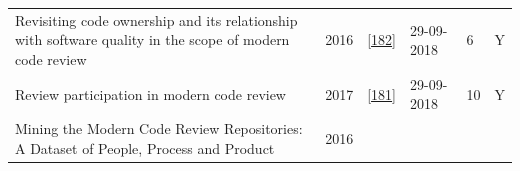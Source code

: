 \documentclass[]{book}
\begin{document}
\begin{longtable}[]{@{}llllll@{}}
\begin{minipage}[t]{0.47\columnwidth}
Revisiting code ownership and its relationship with software quality in
the scope of modern code review\strut
\end{minipage} & \begin{minipage}[t]{0.03\columnwidth}\raggedright\strut
2016\strut
\end{minipage} & \begin{minipage}[t]{0.13\columnwidth}\raggedright\strut
{[}\protect\hyperlink{ref-thongtanunam2016revisiting}{182}{]}\strut
\end{minipage} & \begin{minipage}[t]{0.06\columnwidth}\raggedright\strut
29-09-2018\strut
\end{minipage} & \begin{minipage}[t]{0.07\columnwidth}\raggedright\strut
6\strut
\end{minipage} & \begin{minipage}[t]{0.08\columnwidth}\raggedright\strut
Y\strut
\end{minipage}\tabularnewline
\begin{minipage}[t]{0.47\columnwidth}\raggedright\strut
Review participation in modern code review\strut
\end{minipage} & \begin{minipage}[t]{0.03\columnwidth}\raggedright\strut
2017\strut
\end{minipage} & \begin{minipage}[t]{0.13\columnwidth}\raggedright\strut
{[}\protect\hyperlink{ref-thongtanunam2017review}{181}{]}\strut
\end{minipage} & \begin{minipage}[t]{0.06\columnwidth}\raggedright\strut
29-09-2018\strut
\end{minipage} & \begin{minipage}[t]{0.07\columnwidth}\raggedright\strut
10\strut
\end{minipage} & \begin{minipage}[t]{0.08\columnwidth}\raggedright\strut
Y\strut
\end{minipage}\tabularnewline
\begin{minipage}[t]{0.47\columnwidth}\raggedright\strut
Mining the Modern Code Review Repositories: A Dataset of People, Process
and Product\strut
\end{minipage} & \begin{minipage}[t]{0.03\columnwidth}\raggedright\strut
2016\strut
\end{minipage} & \begin{minipage}[t]{0.13\columnwidth}\raggedright\strut

\end{minipage}
\end{longtable}
\end{document}
